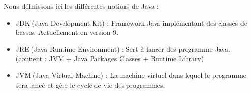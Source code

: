 \documentclass[12pt,a4paper]{book} %
\begin{document}
Nous définissons ici les différentes notions de Java :
\begin{itemize}
  \item JDK (Java Development Kit) : Framework Java implémentant des classes de basses. Actuellement en version 9.
  \item JRE (Java Runtime Environment) : Sert à lancer des programme Java. (contient : JVM + Java Packages Classes + Runtime Library)
  \item JVM (Java Virtual Machine) : La machine virtuel dans lequel le programme sera lancé et gère le cycle de vie des programmes.
\end{itemize}


\cleardoublepage %

\pagestyle{fancy} %




\pagestyle{empty} %

\tableofcontents %

\cleardoublepage %

\pagestyle{fancy} %



\pagestyle{empty} %

\listoffigures %

\cleardoublepage %
\end{document}
